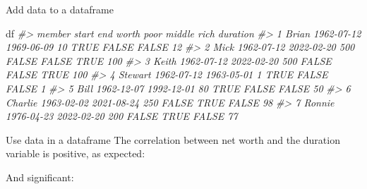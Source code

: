 \documentclass[
  11pt,
  ignorenonframetext,
  svgnames, handout, t]{beamer}
\newenvironment{Shaded}{\begin{snugshade}}{\end{snugshade}}
\newcommand{\CommentTok}[1]{\textcolor[rgb]{0.56,0.35,0.01}{\textit{#1}}}
\newcommand{\FunctionTok}[1]{\textcolor[rgb]{0.00,0.00,0.00}{#1}}
\newcommand{\NormalTok}[1]{#1}
\newcommand{\SpecialCharTok}[1]{\textcolor[rgb]{0.00,0.00,0.00}{#1}}
\begin{document}
\begin{frame}[fragile]{Add data to a dataframe}
\begin{Shaded}
\begin{Highlighting}[]
\NormalTok{df}
\CommentTok{\#\textgreater{}    member      start        end worth  poor middle  rich duration}
\CommentTok{\#\textgreater{} 1   Brian 1962{-}07{-}12 1969{-}06{-}09    10  TRUE  FALSE FALSE       12}
\CommentTok{\#\textgreater{} 2    Mick 1962{-}07{-}12 2022{-}02{-}20   500 FALSE  FALSE  TRUE      100}
\CommentTok{\#\textgreater{} 3   Keith 1962{-}07{-}12 2022{-}02{-}20   500 FALSE  FALSE  TRUE      100}
\CommentTok{\#\textgreater{} 4 Stewart 1962{-}07{-}12 1963{-}05{-}01     1  TRUE  FALSE FALSE        1}
\CommentTok{\#\textgreater{} 5    Bill 1962{-}12{-}07 1992{-}12{-}01    80  TRUE  FALSE FALSE       50}
\CommentTok{\#\textgreater{} 6 Charlie 1963{-}02{-}02 2021{-}08{-}24   250 FALSE   TRUE FALSE       98}
\CommentTok{\#\textgreater{} 7  Ronnie 1976{-}04{-}23 2022{-}02{-}20   200 FALSE   TRUE FALSE       77}
\end{Highlighting}
\end{Shaded}

\normalsize
\end{frame}

\begin{frame}[fragile]{Use data in a dataframe}
\protect\hypertarget{use-data-in-a-dataframe}{}
The correlation between net worth and the duration variable is positive,
as expected:

\footnotesize

\begin{Shaded}
\end{Shaded}

\normalsize

And significant:

\footnotesize

\begin{Shaded}
\end{Shaded}

\normalsize
\end{frame}
\end{document}
